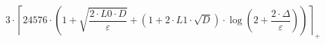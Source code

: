 \[3 \cdot \left\lceil 24576 \cdot \left(1 + \sqrt{\frac{2 \cdot L0 \cdot D}{\varepsilon}} + \left(1 + 2 \cdot L1 \cdot \sqrt{D}\right) \cdot \log\left(2 + \frac{2 \cdot \Delta}{\varepsilon}\right)\right) \right\rceil_{+}\]
